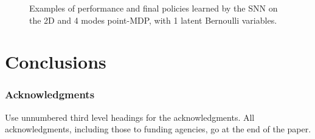 \documentclass{article} %
\begin{document}
\begin{figure}[h!]
	\centering
	\caption{Examples of performance and final policies learned by the SNN on the 2D and 4 modes point-MDP, with 1 latent Bernoulli variables.}
	\label{fig:snn_multimodal_MI}
\end{figure}


\section{Conclusions}

\subsubsection*{Acknowledgments}

Use unnumbered third level headings for the acknowledgments. All
acknowledgments, including those to funding agencies, go at the end of the paper.



\end{document}
